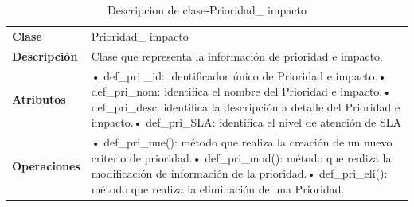 \begin{table}[H]
	\centering
	\caption{Descripcion de clase-Prioridad\_ impacto}
	\begin{tabular}{|p{6.145em}|p{28.07em}|}
		\toprule
		\rowcolor[rgb]{ .125,  .216,  .392} \multicolumn{2}{|p{34.215em}|}{\textcolor[rgb]{ 1,  1,  1}{\textbf{Clase Prioridad\_impacto}}} \\
		\midrule
		\textbf{Clase} & \multicolumn{1}{l|}{Prioridad\_ impacto} \\
		\midrule
		\textbf{Descripción} & Clase que representa la información de prioridad e impacto. \\
		\midrule
		\textbf{Atributos } & •	def\_pri \_id: identificador único de Prioridad e impacto.\newline{}•	def\_pri\_nom: identifica el nombre del Prioridad e impacto.\newline{}•	def\_pri\_desc: identifica la descripción a detalle del Prioridad e impacto.\newline{}•	def\_pri\_SLA: identifica el nivel de atención de SLA \\
		\midrule
		\textbf{Operaciones} & •	def\_pri\_nue():  método que realiza la creación de un nuevo criterio de prioridad.\newline{}•	def\_pri\_mod(): método que  realiza la modificación de información de la  prioridad.\newline{}•	def\_pri\_eli(): método que realiza la eliminación de una Prioridad. \\
		\bottomrule
	\end{tabular}%
	\label{tab:clas13}%
\end{table}%


